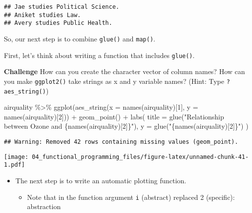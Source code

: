\documentclass[
]{book}
\newenvironment{Shaded}{\begin{snugshade}}{\end{snugshade}}
\newcommand{\AttributeTok}[1]{\textcolor[rgb]{0.77,0.63,0.00}{#1}}
\newcommand{\DecValTok}[1]{\textcolor[rgb]{0.00,0.00,0.81}{#1}}
\newcommand{\FunctionTok}[1]{\textcolor[rgb]{0.00,0.00,0.00}{#1}}
\newcommand{\NormalTok}[1]{#1}
\newcommand{\SpecialCharTok}[1]{\textcolor[rgb]{0.00,0.00,0.00}{#1}}
\newcommand{\StringTok}[1]{\textcolor[rgb]{0.31,0.60,0.02}{#1}}
\providecommand{\tightlist}{%
  \setlength{\itemsep}{0pt}\setlength{\parskip}{0pt}}
\begin{document}
\begin{verbatim}
## Jae studies Political Science.
## Aniket studies Law.
## Avery studies Public Health.
\end{verbatim}

So, our next step is to combine \texttt{glue()} and \texttt{map()}.

First, let's think about writing a function that includes \texttt{glue()}.

\textbf{Challenge}
How can you create the character vector of column names?
How can you make \texttt{ggplot2()} take strings as x and y variable names? (Hint: Type \texttt{?aes\_string()})

\begin{Shaded}
\begin{Highlighting}[]
\NormalTok{airquality }\SpecialCharTok{\%\textgreater{}\%}
  \FunctionTok{ggplot}\NormalTok{(}\FunctionTok{aes\_string}\NormalTok{(}\AttributeTok{x =} \FunctionTok{names}\NormalTok{(airquality)[}\DecValTok{1}\NormalTok{], }\AttributeTok{y =} \FunctionTok{names}\NormalTok{(airquality)[}\DecValTok{2}\NormalTok{])) }\SpecialCharTok{+}
  \FunctionTok{geom\_point}\NormalTok{() }\SpecialCharTok{+}
  \FunctionTok{labs}\NormalTok{(}
    \AttributeTok{title =} \FunctionTok{glue}\NormalTok{(}\StringTok{"Relationship between Ozone and \{names(airquality)[2]\}"}\NormalTok{),}
    \AttributeTok{y =} \FunctionTok{glue}\NormalTok{(}\StringTok{"\{names(airquality)[2]\}"}\NormalTok{)}
\NormalTok{  )}
\end{Highlighting}
\end{Shaded}

\begin{verbatim}
## Warning: Removed 42 rows containing missing values (geom_point).
\end{verbatim}

\texttt{[image: 04\_functional\_programming\_files/figure-latex/unnamed-chunk-41-1.pdf]}

\begin{itemize}
\item
  The next step is to write an automatic plotting function.

  \begin{itemize}
  \tightlist
  \item
    Note that in the function argument \texttt{i} (abstract) replaced 2 (specific): abstraction
  \end{itemize}
\end{itemize}
\end{document}
